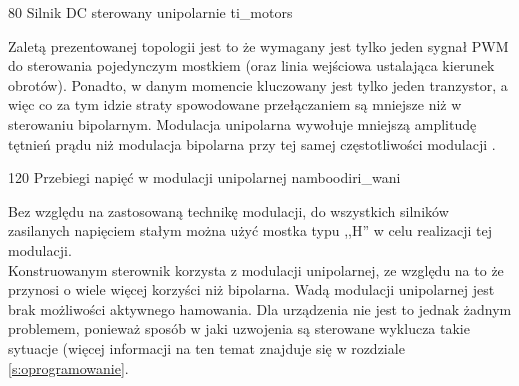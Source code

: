 	{80}
	{Silnik DC sterowany unipolarnie}
	{ti_motors}


Zaletą prezentowanej topologii jest to że wymagany jest tylko jeden sygnał PWM do sterowania pojedynczym mostkiem (oraz linia wejściowa ustalająca kierunek obrotów). Ponadto, w danym momencie kluczowany jest tylko jeden tranzystor, a więc co za tym idzie straty spowodowane przełączaniem są mniejsze niż w sterowaniu bipolarnym. Modulacja unipolarna wywołuje mniejszą amplitudę tętnień prądu niż modulacja bipolarna przy tej samej częstotliwości modulacji \cite{zawirski}. 

	{120}
	{Przebiegi napięć w modulacji unipolarnej}
	{namboodiri_wani}

Bez względu na zastosowaną technikę modulacji, do wszystkich silników zasilanych napięciem stałym można użyć mostka typu ,,H'' w celu realizacji tej modulacji. \\

Konstruowanym sterownik korzysta z modulacji unipolarnej, ze względu na to że przynosi o wiele więcej korzyści niż bipolarna. Wadą modulacji unipolarnej jest brak możliwości aktywnego hamowania. Dla urządzenia nie jest to jednak żadnym problemem, ponieważ sposób w jaki uzwojenia są sterowane wyklucza takie sytuacje (więcej informacji na ten temat znajduje się w rozdziale \ref{s:oprogramowanie}.




